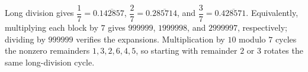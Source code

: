 Long division gives $\dfrac{1}{7}=0.\overline{142857}$, $\dfrac{2}{7}=0.\overline{285714}$, and $\dfrac{3}{7}=0.\overline{428571}$. Equivalently, multiplying each block by $7$ gives $999999$, $1999998$, and $2999997$, respectively; dividing by $999999$ verifies the expansions. Multiplication by $10$ modulo $7$ cycles the nonzero remainders $1,3,2,6,4,5$, so starting with remainder $2$ or $3$ rotates the same long-division cycle.
